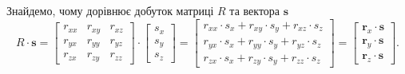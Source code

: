 Знайдемо, чому дорівнює добуток матриці $R$ та вектора $\boldsymbol{s}$
\begin{equation*}
  R \cdot \boldsymbol{s} =
  \begin{bmatrix}
    r_{xx} & r_{xy} & r_{xz} \\
    r_{yx} & r_{yy} & r_{yz} \\
    r_{zx} & r_{zy} & r_{zz}
  \end{bmatrix} \cdot
  \begin{bmatrix}
    s_x \\
    s_y \\
    s_z
  \end{bmatrix} =
  \begin{bmatrix}
    r_{xx} \cdot s_x + r_{xy} \cdot s_y + r_{xz} \cdot s_z \\
    r_{yx} \cdot s_x + r_{yy} \cdot s_y + r_{yz} \cdot s_z \\
    r_{zx} \cdot s_x + r_{zy} \cdot s_y + r_{zz} \cdot s_z
  \end{bmatrix} =
  \begin{bmatrix}
    \boldsymbol{r}_x \cdot \boldsymbol{s} \\
    \boldsymbol{r}_y \cdot \boldsymbol{s} \\
    \boldsymbol{r}_z \cdot \boldsymbol{s}
  \end{bmatrix}.
\end{equation*}


